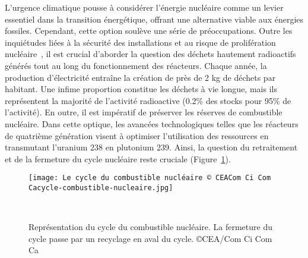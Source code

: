 L'urgence climatique pousse à considérer l'énergie nucléaire comme un levier essentiel dans la transition énergétique, offrant une alternative viable aux énergies fossiles. Cependant, cette option soulève une série de préoccupations. Outre les inquiétudes liées à la sécurité des installations et au risque de prolifération nucléaire~\cite{npt_resolution}, il est crucial d'aborder la question des déchets hautement radioactifs générés tout au long du fonctionnement des réacteurs. Chaque année, la production d'électricité entraîne la création de près de 2 kg de déchets par habitant. Une infime proportion constitue les déchets à vie longue, mais ils représentent la majorité de l'activité radioactive (0.2\% des stocks pour 95\% de l'activité). En outre, il est impératif de préserver les réserves de combustible nucléaire. Dans cette optique, les avancées technologiques telles que les réacteurs de quatrième génération visent à optimiser l'utilisation des ressources en transmutant l'uranium 238 en plutonium 239. Ainsi, la question du retraitement et de la fermeture du cycle nucléaire reste cruciale (Figure~\ref{fig:cycle_comb}).

\begin{figure}
    \centering
    \texttt{[image: Le cycle du combustible nucléaire © CEACom Ci Com Cacycle-combustible-nucleaire.jpg]}
    \caption{Représentation du cycle du combustible nucléaire. La fermeture du cycle passe par un recyclage en aval du cycle. \copyright CEA/Com Ci Com Ca}~\label{fig:cycle_comb}
\end{figure}

